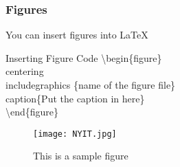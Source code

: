 \documentclass{beamer}
\begin{document}

\begin{frame}
\frametitle{Figures}

You can insert figures into LaTeX

\begin{block}{Inserting Figure Code}
\textbackslash begin\{figure\}
\\
\hspace{1cm}\texbackslash centering
\\
\hspace{1cm}\texbackslash includegraphics \{name of the figure file\}
\\
\hspace{1cm}\texbackslash caption\{Put the caption in here\}
\\
\textbackslash end\{figure\}
\end{block}

\begin{example} [Figure]
\begin{figure}
\centering
\texttt{[image: NYIT.jpg]}
\caption{This is a sample figure}
\end{figure}
\end{example}


\end{frame}

\end{document}
